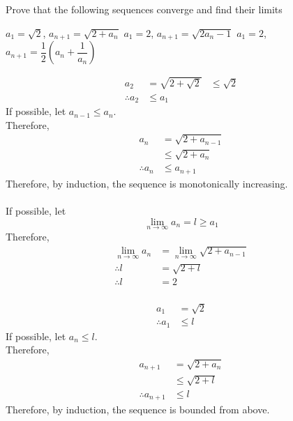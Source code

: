 \documentclass[fleqn, a4paper, 12pt, oneside]{amsart}
\theoremstyle{definition}
\theoremstyle{theorem}
\begin{document}
\begin{question}
	Prove that the following sequences converge and find their limits
	\begin{tasks}
		\task $a_1 = \sqrt{2}$, $a_{n + 1} = \sqrt{2 + a_n}$
		\task $a_1 = 2$, $a_{n + 1} = \sqrt{2 a_n - 1}$
		\task $a_1 = 2$, $a_{n + 1} = \dfrac{1}{2} \left( a_n + \dfrac{1}{a_n} \right)$
	\end{tasks}
\end{question}

\begin{solution}
	\begin{tasks}
		\task
			\begin{align*}
				a_2 &= \sqrt{2 + \sqrt{2}}
				&\le \sqrt{2}\\
				\therefore a_2 &\le a_1
			\end{align*}
			If possible, let $a_{n - 1} \le a_n$.\\
			Therefore,
			\begin{align*}
				a_n &= \sqrt{2 + a_{n - 1}}\\
				&\le \sqrt{2 + a_n}\\
				\therefore a_n &\le a_{n + 1}
			\end{align*}
			Therefore, by induction, the sequence is monotonically increasing.\\
			~\\
			If possible, let 
			\begin{equation*}
				\lim\limits_{n \to \infty} a_n = l \ge a_1
			\end{equation*}
			Therefore,
			\begin{align*}
				\lim\limits_{n \to \infty} a_n &= \lim\limits_{n \to \infty} \sqrt{2 + a_{n - 1}}\\
				\therefore l &= \sqrt{2 + l}\\
				\therefore l &= 2
			\end{align*}
			~\\
			\begin{align*}
				a_1 &= \sqrt{2}\\
				\therefore a_1 &\le l
			\end{align*}
			If possible, let $a_n \le l$.\\
			Therefore,
			\begin{align*}
				a_{n + 1} &= \sqrt{2 + a_n}\\
				&\le \sqrt{2 + l}\\
				\therefore a_{n + 1} &\le l
			\end{align*}
			Therefore, by induction, the sequence is bounded from above.\\

\end{tasks}
\end{solution}
\end{document}
